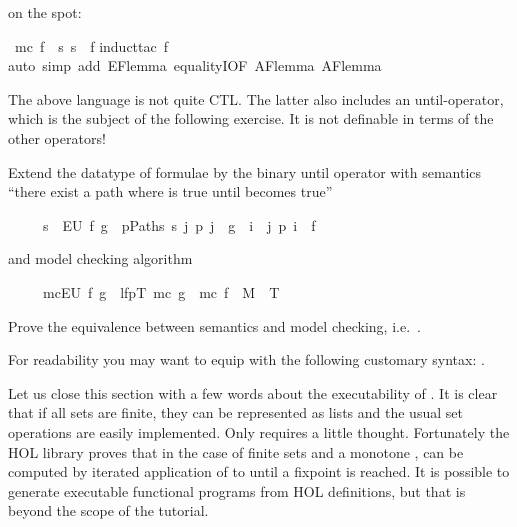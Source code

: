 \begin{isabellebody}
\begin{isamarkuptext}
on the spot:%
\end{isamarkuptext}%
\ {\isachardoublequote}mc\ f\ {\isacharequal}\ {\isacharbraceleft}s{\isachardot}\ s\ {\isasymTurnstile}\ f{\isacharbraceright}{\isachardoublequote}\isanewline
{}induct{\isacharunderscore}tac\ f{\isacharparenright}\isanewline
{}auto\ simp\ add{\isacharcolon}\ EF{\isacharunderscore}lemma\ equalityI{\isacharbrackleft}OF\ AF{\isacharunderscore}lemma\ AF{\isacharunderscore}lemma\isanewline
{}%
\begin{isamarkuptext}%
The above language is not quite CTL. The latter also includes an
until-operator, which is the subject of the following exercise.
It is not definable in terms of the other operators!
\begin{exercise}
Extend the datatype of formulae by the binary until operator  with semantics
``there exist a path where  is true until  becomes true''
\begin{isabelle}%
\ \ \ \ \ s\ {\isasymTurnstile}\ EU\ f\ g\ {\isacharequal}\ {\isacharparenleft}{\isasymexists}p{\isasymin}Paths\ s{\isachardot}\ {\isasymexists}j{\isachardot}\ p\ j\ {\isasymTurnstile}\ g\ {\isasymand}\ {\isacharparenleft}{\isasymexists}i\ {\isacharless}\ j{\isachardot}\ p\ i\ {\isasymTurnstile}\ f{\isacharparenright}{\isacharparenright}%
\end{isabelle}
and model checking algorithm
\begin{isabelle}%
\ \ \ \ \ mc{\isacharparenleft}EU\ f\ g{\isacharparenright}\ {\isacharequal}\ lfp{\isacharparenleft}{\isasymlambda}T{\isachardot}\ mc\ g\ {\isasymunion}\ mc\ f\ {\isasyminter}\ {\isacharparenleft}M{\isacharcircum}{\isacharminus}\ {\isacharcircum}{\isacharcircum}\ T{\isacharparenright}{\isacharparenright}%
\end{isabelle}
Prove the equivalence between semantics and model checking, i.e.\
.

For readability you may want to equip  with the following customary syntax:
\isa{E{\isacharbrackleft}f\ U\ g{\isacharbrackright}}.
\end{exercise}

Let us close this section with a few words about the executability of .
It is clear that if all sets are finite, they can be represented as lists and the usual
set operations are easily implemented. Only \isa{lfp} requires a little thought.
Fortunately the HOL library proves that in the case of finite sets and a monotone ,
\isa{lfp\ F} can be computed by iterated application of \isa{F} to \isa{{\isacharbraceleft}{\isacharbraceright}} until
a fixpoint is reached. It is possible to generate executable functional programs
from HOL definitions, but that is beyond the scope of the tutorial.%
\end{isamarkuptext}%
\end{isabellebody}%
